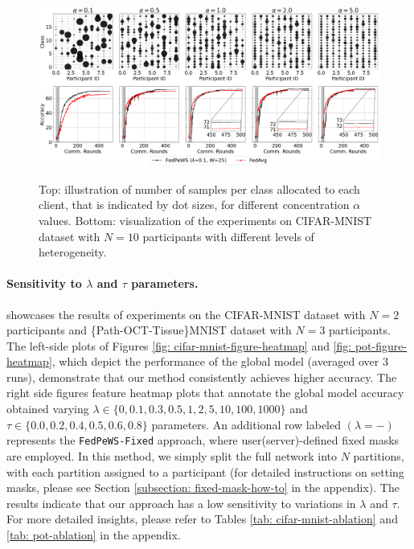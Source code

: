 \documentclass{article}
\begin{document}
\begin{figure}
    \centering
    {\includegraphics[trim={0cm 0.2cm 0 0.2cm},clip,width=\linewidth]{images/dir-cifar-mnist-n10-zoom-partial-v2.pdf}}
    \caption{Top: illustration of number of samples per class allocated to each client, that is indicated by dot sizes, for different concentration $\alpha$ values. Bottom: visualization of the experiments on CIFAR-MNIST dataset with $N=10$ participants with different levels of heterogeneity.} 
    \label{fig: dirichlet}
\end{figure}


\paragraph{Sensitivity to $\lambda$ and $\tau$ parameters.}  showcases the results of experiments on the CIFAR-MNIST dataset with $N=2$ participants and \{Path-OCT-Tissue\}MNIST dataset with $N=3$ participants. 
The left-side plots of Figures \ref{fig: cifar-mnist-figure-heatmap} and \ref{fig: pot-figure-heatmap}, which depict the performance of the global model (averaged over 3 runs), demonstrate that our method consistently achieves higher accuracy. The right side figures feature heatmap plots that annotate the global model accuracy obtained varying $\lambda \in \{0, 0.1, 0.3, 0.5, 1, 2, 5, 10, 100, 1000\}$ and $\tau \in \{0.0, 0.2, 0.4, 0.5, 0.6, 0.8\}$ parameters. An additional row labeled $(\lambda=-)$ represents the \texttt{FedPeWS-Fixed} approach, where user(server)-defined fixed masks are employed. In this method, we simply split the full network into $N$ partitions, with each partition assigned to a participant (for detailed instructions on setting masks, please see Section \ref{subsection: fixed-mask-how-to} in the appendix). The results indicate that our approach has a low sensitivity to variations in $\lambda$ and $\tau$. For more detailed insights, please refer to Tables \ref{tab: cifar-mnist-ablation} and \ref{tab: pot-ablation} in the appendix. 
\end{document}
